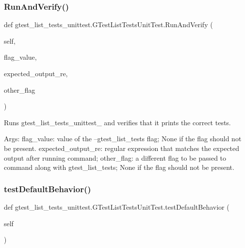 \subsubsection{\texorpdfstring{Run\+And\+Verify()}{RunAndVerify()}}
{\footnotesize\ttfamily def gtest\+\_\+list\+\_\+tests\+\_\+unittest.\+G\+Test\+List\+Tests\+Unit\+Test.\+Run\+And\+Verify (\begin{DoxyParamCaption}\item[{}]{self,  }\item[{}]{flag\+\_\+value,  }\item[{}]{expected\+\_\+output\+\_\+re,  }\item[{}]{other\+\_\+flag }\end{DoxyParamCaption})}

\begin{DoxyVerb}Runs gtest_list_tests_unittest_ and verifies that it prints
the correct tests.

Args:
  flag_value:         value of the --gtest_list_tests flag;
                  None if the flag should not be present.
  expected_output_re: regular expression that matches the expected
                  output after running command;
  other_flag:         a different flag to be passed to command
                  along with gtest_list_tests;
                  None if the flag should not be present.
\end{DoxyVerb}
 \mbox{\label{classgtest__list__tests__unittest_1_1_g_test_list_tests_unit_test_a4168d086b7ec31f86ab548b6fd79b27e}} 
\subsubsection{\texorpdfstring{test\+Default\+Behavior()}{testDefaultBehavior()}}
{\footnotesize\ttfamily def gtest\+\_\+list\+\_\+tests\+\_\+unittest.\+G\+Test\+List\+Tests\+Unit\+Test.\+test\+Default\+Behavior (\begin{DoxyParamCaption}\item[{}]{self }\end{DoxyParamCaption})}

